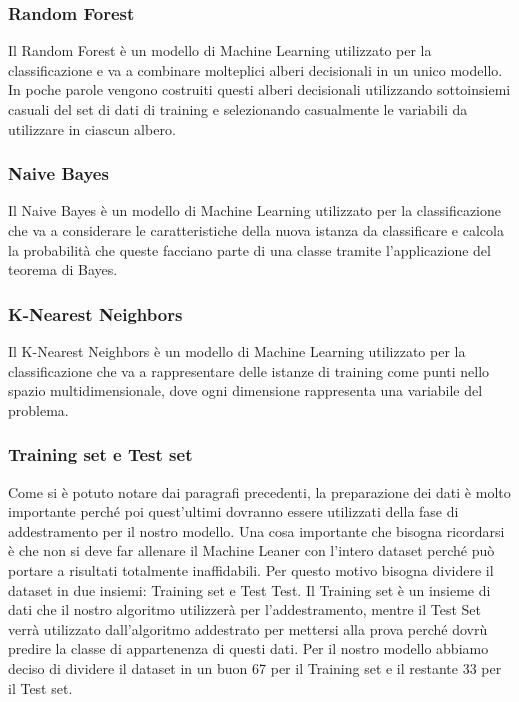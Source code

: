 \documentclass[12pt]{article}
\begin{document}
\subsubsection{Random Forest}
Il Random Forest è un modello di Machine Learning utilizzato per la classificazione e va a combinare molteplici alberi decisionali in un unico modello. In poche parole vengono costruiti questi alberi
decisionali utilizzando sottoinsiemi casuali del set di dati di training e selezionando casualmente le variabili da utilizzare in ciascun albero.

\subsubsection{Naive Bayes}
Il Naive Bayes è un modello di Machine Learning utilizzato per la classificazione che va a considerare le caratteristiche della nuova istanza da classificare e calcola la probabilità che queste facciano parte di una classe
tramite l'applicazione del teorema di Bayes.

\subsubsection{K-Nearest Neighbors}
Il K-Nearest Neighbors è un modello di Machine Learning utilizzato per la classificazione che va a rappresentare delle istanze di training come punti nello spazio multidimensionale, dove ogni dimensione
rappresenta una variabile del problema.

\subsubsection{Training set e Test set}
Come si è potuto notare dai paragrafi precedenti, la preparazione dei dati è molto importante perché poi quest'ultimi dovranno essere utilizzati della fase di addestramento per il nostro modello. Una cosa importante che bisogna ricordarsi è che non si deve far allenare il Machine Leaner con
l'intero dataset perché può portare a risultati totalmente inaffidabili. Per questo motivo bisogna dividere il dataset  in due insiemi: Training set e Test Test. Il Training set è un insieme di dati che il nostro algoritmo utilizzerà per l'addestramento, mentre il Test Set verrà utilizzato dall'algoritmo 
addestrato per mettersi alla prova perché dovrù predire la classe di appartenenza di questi dati.
Per il nostro modello abbiamo deciso di dividere il dataset in un buon 67 per il Training set e il restante 33 per il Test set.
\end{document}
